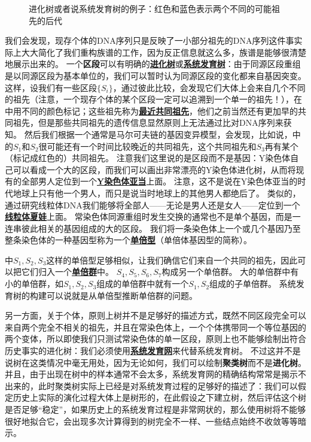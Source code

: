 \documentclass[hyperref, UTF8, a4paper, oneside]{ctexart}
\renewcommand{\emph}[1]{\textbf{#1}}
\newcommand*{\concept}[1]{\underline{\textbf{#1}}}
\numberwithin{equation}{section}
\begin{document}
\begin{figure}
    \centering
    
    \caption{进化树或者说系统发育树的例子：红色和蓝色表示两个不同的可能祖先的后代}
    \label{fig:tree-example}
\end{figure}

我们会发现，现存个体的DNA序列只是反映了一小部分祖先的DNA序列这件事实际上大大简化了我们重构族谱的工作，因为反正信息就这么多，族谱是能够很清楚地展示出来的。
一个\emph{区段}可以有明确的\concept{进化树}或\concept{系统发育树}：由于同源区段重组是以同源区段为基本单位的，我们可以暂时认为同源区段的变化都来自基因突变。
这样，设我们有一些区段$\{S_{i}\}$，通过彼此比较，会发现它们大体上会来自几个不同的祖先（注意，一个现存个体的某个区段一定可以追溯到一个单一的祖先！），在中用不同的颜色标记；这些祖先称为\concept{最近共同祖先}，他们之前当然还有更加早的共同祖先，但是那些共同祖先的遗传信息显然原则上无法通过比对DNA序列来获知。
然后我们根据一个通常是马尔可夫链的基因变异模型，会发现，比如说，中的$S_1$和$S_2$很可能还有一个时间比较晚近的共同祖先，这个共同祖先和$S_3$再有某个（标记成红色的）共同祖先。
注意我们这里说的是区段而不是基因：Y染色体自己可以看成一个大的区段，而我们可以画出非常漂亮的Y染色体进化树，从而将现有的全部男人定位到一个\concept{Y染色体亚当}上面。
注意，这不是说在Y染色体亚当的时代地球上只有他一个男人，而只是说当时地球上的其他男人都绝后了。
类似的，通过研究线粒体DNA我们能够将全部人——无论是男人还是女人——定位到一个\concept{线粒体夏娃}上面。
常染色体同源重组时发生交换的通常也不是单个基因，而是一连串彼此相关的基因组成的大的区段。
我们将一条染色体上一个或几个基因乃至整条染色体的一种基因型称为一个\concept{单倍型}（单倍体基因型的简称）。

中$S_1, S_2, S_3$这样的单倍型足够相似，让我们确信它们来自一个共同的祖先，因此可以把它们归入一个\concept{单倍群}中。
$S_4, S_5, S_6, S_7$构成另一个单倍群。
大的单倍群中有小的单倍群，如$S_1, S_2, S_3$组成的单倍群中就有一个$S_1, S_2$组成的子单倍群。
系统发育树的构建可以说就是从单倍型推断单倍群的问题。

另一方面，关于个体，原则上树并不是足够好的描述方式，既然不同区段完全可以来自两个完全不相关的祖先，并且在常染色体上，一个个体携带同一个等位基因的两个变体，所以即使我们只测试常染色体的单一区段，原则上也不能够绘制出符合历史事实的进化树：我们必须使用\concept{系统发育网}来代替系统发育树。
不过这并不是说树在这类情况中毫无用处，因为无论如何，我们可以绘制\emph{聚类树}而不是\emph{进化树}。
并且，由于出现在树中的样本通常不会太多，系统发育网的精确结构常常是揭示不出来的，此时聚类树实际上已经是对系统发育过程的足够好的描述了：我们可以假定历史上实际的演化过程大体上是树形的，在此假设之下建立树，然后评估这个树是否足够“稳定”，如果历史上的系统发育过程是非常网状的，那么使用树将不能够很好地拟合它，会出现多次计算得到的树完全不一样、一些结点始终不收敛等等暗示。
\end{document}
